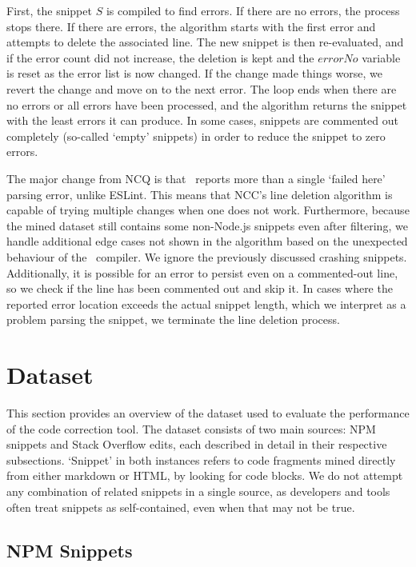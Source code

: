 \documentclass[conference]{IEEEtran}
\begin{document}
First, the snippet $S$ is compiled to find errors. If there are no errors, the process stops there. If there are errors, the algorithm starts with the first error and attempts to delete the associated line. The new snippet is then re-evaluated, and if the error count did not increase, the deletion is kept and the $errorNo$ variable is reset as the error list is now changed. If the change made things worse, we revert the change and move on to the next error. The loop ends when there are no errors or all errors have been processed, and the algorithm returns the snippet with the least errors it can produce. In some cases, snippets are commented out completely (so-called `empty' snippets) in order to reduce the snippet to zero errors.

The major change from NCQ is that \ts\ reports more than a single `failed here' parsing error, unlike ESLint. This means that NCC's line deletion algorithm is capable of trying multiple changes when one does not work. Furthermore, because the mined dataset still contains some non-Node.js snippets even after filtering, we handle additional edge cases not shown in the algorithm based on the unexpected behaviour of the \ts\ compiler. We ignore the previously discussed crashing snippets. Additionally, it is possible for an error to persist even on a commented-out line, so we check if the line has been commented out and skip it. In cases where the reported error location exceeds the actual snippet length, which we interpret as a problem parsing the snippet, we terminate the line deletion process.

\section{Dataset}
\label{sec:dataset}

This section provides an overview of the dataset used to evaluate the performance of the code correction tool. The dataset consists of two main sources: NPM snippets and Stack Overflow edits, each described in detail in their respective subsections. `Snippet' in both instances refers to code fragments mined directly from either markdown or HTML, by looking for code blocks. We do not attempt any combination of related snippets in a single source, as developers and tools often treat snippets as self-contained, even when that may not be true.

\subsection{NPM Snippets}
\label{sec:npm_snippets}
\end{document}
